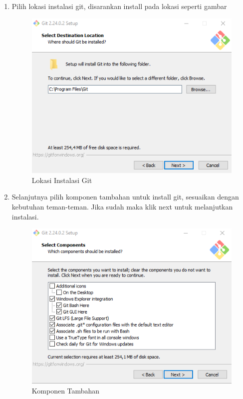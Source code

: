 \begin{enumerate}
\item Pilih lokasi instalasi git, disarankan install pada lokasi seperti gambar
\begin{figure}[H]
\centering
\includegraphics[scale=.5]{figures/install_git2}
\caption{Lokasi Instalasi Git}
\label{install_git2}
\end{figure}

\item Selanjutnya pilih komponen tambahan untuk install git, sesuaikan dengan kebutuhan teman-teman. Jika sudah maka klik next untuk melanjutkan instalasi.
\begin{figure}[H]
\centering
\includegraphics[scale=.5]{figures/install_git3}
\caption{Komponen Tambahan}
\label{install_git3}
\end{figure}


\end{enumerate}
